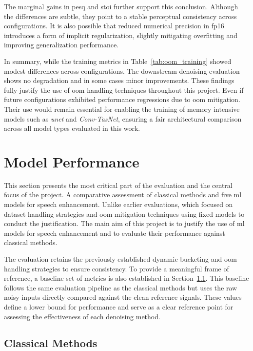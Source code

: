 The marginal gains in \gls{pesq} and \gls{stoi} further support this conclusion. Although the differences are subtle, they point to a stable perceptual consistency across configurations. It is also possible that reduced numerical precision in \gls{fp16} introduces a form of implicit regularization, slightly mitigating overfitting and improving generalization performance.

In summary, while the training metrics in Table~\ref{tab:oom_training} showed modest differences across configurations. The downstream denoising evaluation shows no degradation and in some cases minor improvements. These findings fully justify the use of \gls{oom} handling techniques throughout this project. Even if future configurations exhibited performance regressions due to \gls{oom} mitigation. Their use would remain essential for enabling the training of memory intensive models such as \textit{\gls{unet}} and \textit{Conv-TasNet}, ensuring a fair architectural comparison across all model types evaluated in this work.

\section{Model Performance}
\label{sec:model_performance}

This section presents the most critical part of the evaluation and the central focus of the project. A comparative assessment of classical methods and five \gls{ml} models for speech enhancement. Unlike earlier evaluations, which focused on dataset handling strategies and \gls{oom} mitigation techniques using fixed models to conduct the justification. The main aim of this project is to justify the use of \gls{ml} models for speech enhancement and to evaluate their performance against classical methods.

The evaluation retains the previously established dynamic bucketing and \gls{oom} handling strategies to ensure consistency. To provide a meaningful frame of reference, a baseline set of metrics is also established in Section~\ref{sec:classical_methods}. This baseline follows the same evaluation pipeline as the classical methods but uses the raw noisy inputs directly compared against the clean reference signals. These values define a lower bound for performance and serve as a clear reference point for assessing the effectiveness of each denoising method.

\subsection{Classical Methods}
\label{sec:classical_methods}


